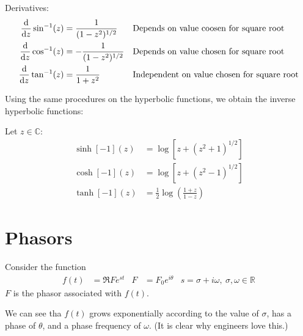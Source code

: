 \documentclass[12pt, english]{book}
\begin{document}
	Derivatives:
	\begin{align*}
		\dv{z} \sin[-1](z) &= \frac{1}{(1-z^2)^{1/2}}
			& &\text{Depends on value coosen for square root} \\
		\dv{z} \cos[-1](z) &= -\frac{1}{(1-z^2)^{1/2}}
			& &\text{Depends on value chosen for square root} \\
		\dv{z} \tan[-1](z) &= \frac{1}{1 + z^2}
			& &\text{Independent on value chosen for square root}
	\end{align*}

	Using the same procedures on the hyperbolic functions, we obtain the inverse hyperbolic functions:
	\begin{definition}
		\label{Inverse Hyperbolic Functions Definition - Complex}
		Let \(z \in \mathbb{C}\):
		\begin{align*}
			\sinh[-1](z) &= \log\left[z + (z^2 + 1)^{1/2}\right] \\
			\cosh[-1](z) &= \log\left[z + (z^2 - 1)^{1/2}\right] \\
			\tanh[-1](z) &= \frac{1}{2}\log\left(\frac{1+z}{1-z}\right)
		\end{align*}
	\end{definition} 


	\section{Phasors} \label{Phasors Section - Complex}
	
	\begin{definition}[Phasor]
		\label{Phasor Definition - Complex}
		Consider the function 
		\begin{align*}
			f(t) &= \Re{Fe^{st}} & F &= F_0 e^{i\theta} & s = \sigma + i \omega, \ \sigma, \omega \in \mathbb{R}
		\end{align*}
		\(F\) is the phasor associated with \(f(t)\).
	\end{definition}
	We can see tha \(f(t)\) grows exponentially according to the value of \(\sigma\), has a phase of \(\theta\), and a phase frequency of \(\omega\). (It is clear why engineers love this.)
	
\end{document}
